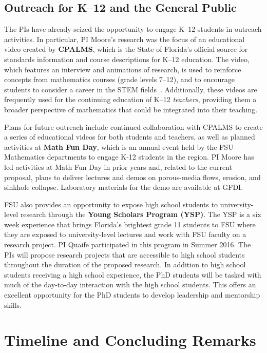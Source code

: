 \documentclass[11pt]{article}
\begin{document}
\subsection{Outreach for K--12 and the General Public}
The PIs have already seized the opportunity to engage K--12 students in outreach activities. In particular, PI Moore's research was the focus of an educational video created by {\bf CPALMS}, which is the State of Florida's official source for standards information and course descriptions for K--12 education. The video, which features an interview and animations of research, is used to reinforce concepts from mathematics courses (grade levels 7--12), and to encourage students to consider a career in the STEM fields~\cite{CPALMS}. Additionally, these videos are frequently used for the continuing education of K--12 {\em teachers}, providing them a broader perspective of mathematics that could be integrated into their teaching.
 
Plans for future outreach include continued collaboration with CPALMS to create a series of educational videos for both students and teachers, as well as planned activities at {\bf Math Fun Day}, which is an annual event held by the FSU Mathematics departments to engage K-12 students in the region. PI Moore has led activities at Math Fun Day in prior years and, related to the current proposal, plans to deliver lectures and demos on porous-media flows, erosion, and sinkhole collapse. Laboratory materials for the demo are available at GFDI.

FSU also provides an opportunity to expose high school students to university-level research through the {\bf Young Scholars Program (YSP)}. The YSP is a six week experience that brings Florida's brightest grade 11 students to FSU where they are exposed to university-level lectures and work with FSU faculty on a research project. PI Quaife participated in this program in Summer 2016. The PIs will propose research projects that are accessible to high school students throughout the duration of the proposed research. In addition to high school students receiving a high school experience, the PhD students will be tasked with much of the day-to-day interaction with the high school students. This offers an excellent opportunity for the PhD students to develop leadership and mentorship skills.

\section{Timeline and Concluding Remarks}




\newpage
\setcounter{page}{1}

%

\end{document}

